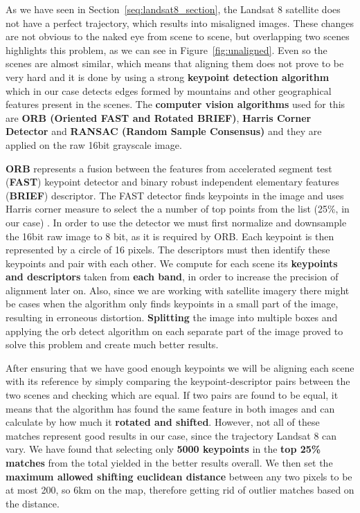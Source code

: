 \documentclass[12pt, a4paper]{report}
\begin{document}
	\par As we have seen in Section~\ref{seq:landsat8_section}, the Landsat 8 satellite does not have a perfect trajectory, which results into misaligned images. These changes are not obvious to the naked eye from scene to scene, but overlapping two scenes highlights this problem, as we can see in Figure~\ref{fig:unaligned}. Even so the scenes are almost similar, which means that aligning them does not prove to be very hard and it is done by using a strong \textbf{keypoint detection algorithm} which in our case detects edges formed by mountains and other geographical features present in the scenes. The \textbf{computer vision algorithms} used for this are \textbf{ORB (Oriented FAST and Rotated BRIEF)}, \textbf{Harris Corner Detector} and \textbf{RANSAC (Random Sample Consensus)} and they are applied on the raw 16bit grayscale image.
	
	\par \textbf{ORB} represents a fusion between the features from accelerated segment test (\textbf{FAST}) keypoint detector and binary robust independent elementary features (\textbf{BRIEF}) descriptor. The FAST detector finds keypoints in the image and uses Harris corner measure to select the a number of top points from the list (25\%, in our case) \cite{orb}. In order to use the detector we must first normalize and downsample the 16bit raw image to 8 bit, as it is required by ORB. Each keypoint is then represented by a circle of 16 pixels. The descriptors must then identify these keypoints and pair with each other.
	We compute for each scene its \textbf{keypoints and descriptors} taken from \textbf{each band}, in order to increase the precision of alignment later on. Also, since we are working with satellite imagery there might be cases when the algorithm only finds keypoints in a small part of the image, resulting in erroneous distortion. \textbf{Splitting} the image into multiple boxes and applying the orb detect algorithm on each separate part of the image proved to solve this problem and create much better results. 
	
	\par After ensuring that we have good enough keypoints we will be aligning each scene with its reference by simply comparing the keypoint-descriptor pairs between the two scenes and checking which are equal. If two pairs are found to be equal, it means that the algorithm has found the same feature in both images and can calculate by how much it \textbf{rotated and shifted}. However, not all of these matches represent good results in our case, since the trajectory Landsat 8 can vary. We have found that selecting only \textbf{5000 keypoints} in the \textbf{top 25\% matches} from the total yielded in the better results overall. We then set the \textbf{maximum allowed shifting euclidean distance} between any two pixels to be at most 200, so 6km on the map, therefore getting rid of outlier matches based on the distance.
	
\end{document}
